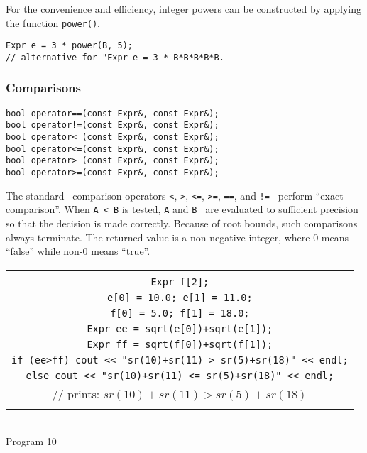 
For the convenience and efficiency,
integer powers can be constructed by
applying the function {\tt power()}.
	
\nopagebreak
\begin{progb}{
\> \tt Expr e = 3 * power(B, 5);\\
\> \>     // alternative for "Expr e = 3 * B*B*B*B*B.\\
}\end{progb}

\subsubsection{Comparisons}

\begin{progb} {
\> \tt  bool operator==(const Expr\&, const Expr\&); \\
\> \tt  bool operator!=(const Expr\&, const Expr\&); \\
\> \tt  bool operator< (const Expr\&, const Expr\&); \\
\> \tt  bool operator<=(const Expr\&, const Expr\&); \\
\> \tt  bool operator> (const Expr\&, const Expr\&); \\
\> \tt  bool operator>=(const Expr\&, const Expr\&);
}\end{progb}

The standard \cpp\ comparison operators {\tt <}, {\tt >}, {\tt <=},
{\tt >=}, {\tt ==}, and {\tt != } perform ``exact comparison''. When
{\tt A < B} is tested, {\tt A} and {\tt B } are evaluated to
sufficient precision so that the decision is made correctly. Because
of root bounds, such comparisons always terminate. The
returned value is a non-negative integer, where 0 means ``false'' while
non-0 means ``true''.

\nopagebreak
\begin{center}
\begin{tabular}{c}
\begin{progb}{
\> \tt Expr e[2];\\
\> \tt Expr f[2];\\
\> \tt e[0] = 10.0; e[1] = 11.0;\\
\> \tt f[0] = 5.0;  f[1] = 18.0;\\
\> \tt Expr ee = sqrt(e[0])+sqrt(e[1]);\\
\> \tt Expr ff = sqrt(f[0])+sqrt(f[1]);\\
\> \tt if (ee>ff) cout << "sr(10)+sr(11) > sr(5)+sr(18)" << endl;\\
\> \tt     else cout << "sr(10)+sr(11) <= sr(5)+sr(18)" << endl;\\
\> // prints: $sr(10)+sr(11) > sr(5)+sr(18)$\\
}\end{progb}
\end{tabular}\\
	Program 10
\end{center}

